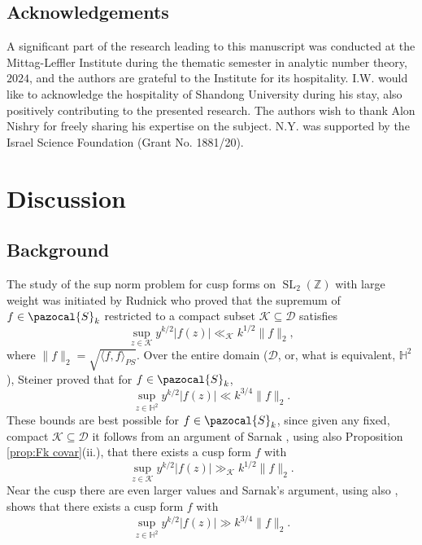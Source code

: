 \documentclass[12pt, a4paper]{amsart}
\newcommand{\tmop}[1]{\ensuremath{\operatorname{#1}}}
\theoremstyle{definition}
\newcommand {\1} {\mathbf{1}}
\newcommand {\Hb} {\mathbb {H}}
\newcommand {\Dc} {\mathcal{D}}
\newcommand {\Kc} {\mathcal{K}}
\newcommand{\Sc}{{\pazocal{S}}}
\numberwithin{equation}{section}
\begin{document}
\subsection{Acknowledgements}


A significant part of the research leading to this manuscript was conducted at the Mittag-Leffler Institute during the thematic semester in analytic number theory, $2024$,
and the authors are grateful to the Institute for its hospitality. I.W. would like to acknowledge the hospitality of Shandong University during his stay, also positively contributing to the
presented research.
The authors wish to thank Alon Nishry for freely sharing his expertise on the subject.
N.Y. was supported by the Israel Science Foundation (Grant No. 1881/20).

\section{Discussion}
\label{sec:discussion}

\subsection{Background}

The study of the sup norm problem for cusp forms on $\tmop{SL}_2(\mathbb Z)$ with large weight was initiated by Rudnick
\cite[Proposition A.1]{Rudnick}
who proved that the supremum of $f \in \Sc_k$ restricted to a compact subset $\Kc \subseteq \Dc$ satisfies
\begin{equation}
\label{eq:RudnickBoundIntro}
\sup_{z \in \Kc} y^{k/2} |f(z) | \ll_{\Kc} k^{1/2} \lVert f \rVert_2,
\end{equation}
where $\lVert f \rVert_2=\sqrt{\langle f,f\rangle_{PS}}$.
Over the entire domain ($\Dc$, or, what is equivalent, $\Hb^{2}$), Steiner \cite[Corollary 1.4]{Steiner} proved that for $f \in \Sc_k$,
\begin{equation}
\label{eq:SteinerBoundIntro}
 \sup_{z \in \Hb^{2}} y^{k/2} |f(z)| \ll k^{3/4} \lVert f \rVert_2.
\end{equation}
These bounds are best possible for $f \in \Sc_k$, since given any fixed, compact $\Kc \subseteq \Dc$ it follows from an argument of Sarnak
\cite[p. 2-3]{sarnak-2004}, using also Proposition \ref{prop:Fk covar}(ii.), that there exists a cusp form $f$ with
\[
\sup_{z\in \mathcal K} y^{k/2}|f(z)| \gg_{\mathcal K} k^{1/2} \lVert f \rVert_2 .
\]
Near the cusp there are even larger values and Sarnak's argument, using also
\cite[Theorem 1.3]{Steiner},
shows that there exists a cusp form $f$ with
\[
\sup_{z \in \Hb^{2}} y^{k/2}|f(z)| \gg k^{3/4} \lVert f \rVert_2 .
\]
\end{document}
